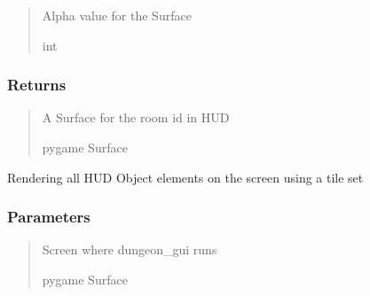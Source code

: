 \documentclass[letterpaper,10pt,english]{sphinxmanual}
\begin{document}
\begin{fulllineitems}
\begin{fulllineitems}
\begin{quote}
\begin{description}
\sphinxAtStartPar
Alpha value for the Surface

\sphinxAtStartPar
int

\end{description}\end{quote}


\subsubsection{Returns}
\label{\detokenize{api_reference/dungeon_gui/hud:returns}}\begin{quote}\begin{description}
\sphinxAtStartPar
A Surface for the room id in HUD

\sphinxAtStartPar
pygame Surface

\end{description}\end{quote}

\end{fulllineitems}


\begin{fulllineitems}
\label{\detokenize{api_reference/dungeon_gui/hud:hud.HUD.render}}
\pysigstartsignatures
{}
\pysigstopsignatures
\sphinxAtStartPar
Rendering all HUD Object elements on the screen using a tile set


\subsubsection{Parameters}
\label{\detokenize{api_reference/dungeon_gui/hud:id1}}\begin{quote}\begin{description}
\sphinxAtStartPar
Screen where dungeon\_gui runs

\sphinxAtStartPar
pygame Surface

\end{description}\end{quote}

\end{fulllineitems}



\end{fulllineitems}
\end{document}
